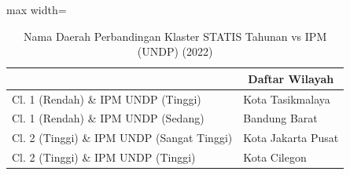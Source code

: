 \begin{table}[H]
\centering
\caption{Nama Daerah Perbandingan Klaster STATIS Tahunan vs IPM (UNDP) (2022)} \label{tab:sample1statis_ipm_name_2022}
\begin{adjustbox}{max width=\textwidth}
\begin{tabular}{|>{\centering\arraybackslash}p{4cm}|p{10cm}|}
\hline
\multicolumn{1}{|c|}{\textbf{Kategori}} & \multicolumn{1}{c|}{\textbf{Daftar Wilayah}} \\
\hline
Cl. 1 (Rendah) \& IPM UNDP (Tinggi) & Kota Tasikmalaya \\
\hline
Cl. 1 (Rendah) \& IPM UNDP (Sedang) & Bandung Barat \\
\hline
Cl. 2 (Tinggi) \& IPM UNDP (Sangat Tinggi) & Kota Jakarta Pusat \\
\hline
Cl. 2 (Tinggi) \& IPM UNDP (Tinggi) & Kota Cilegon \\
\hline
\end{tabular}
\end{adjustbox}
\end{table}